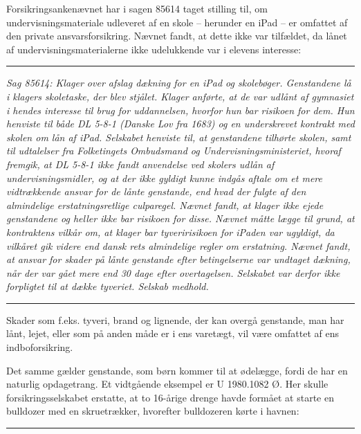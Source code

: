 \documentclass[]{book}
\begin{document}
Forsikringsankenævnet har i sagen 85614 taget stilling til, om undervisningsmateriale udleveret af en skole -- herunder en iPad -- er omfattet af den private ansvarsforsikring. Nævnet fandt, at dette ikke var tilfældet, da lånet af undervisningsmaterialerne ikke udelukkende var i elevens interesse:

\begin{center}\rule{0.5\linewidth}{\linethickness}\end{center}

\emph{Sag 85614: Klager over afslag dækning for en iPad og skolebøger. Genstandene lå i klagers skoletaske, der blev stjålet. Klager anførte, at de var udlånt af gymnasiet i hendes interesse til brug for uddannelsen, hvorfor hun bar risikoen for dem. Hun henviste til både DL 5-8-1 (Danske Lov fra 1683) og en underskrevet kontrakt med skolen om lån af iPad. Selskabet henviste til, at genstandene tilhørte skolen, samt til udtalelser fra Folketingets Ombudsmand og Undervisningsministeriet, hvoraf fremgik, at DL 5-8-1 ikke fandt anvendelse ved skolers udlån af undervisningsmidler, og at der ikke gyldigt kunne indgås aftale om et mere vidtrækkende ansvar for de lånte genstande, end hvad der fulgte af den almindelige erstatningsretlige culparegel. Nævnet fandt, at klager ikke ejede genstandene og heller ikke bar risikoen for disse. Nævnet måtte lægge til grund, at kontraktens vilkår om, at klager bar tyveririsikoen for iPaden var ugyldigt, da vilkåret gik videre end dansk rets almindelige regler om erstatning. Nævnet fandt, at ansvar for skader på lånte genstande efter betingelserne var undtaget dækning, når der var gået mere end 30 dage efter overtagelsen. Selskabet var derfor ikke forpligtet til at dække tyveriet. Selskab medhold.}

\begin{center}\rule{0.5\linewidth}{\linethickness}\end{center}

Skader som f.eks. tyveri, brand og lignende, der kan overgå genstande, man har lånt, lejet, eller som på anden måde er i ens varetægt, vil være omfattet af ens indboforsikring.

Det samme gælder genstande, som børn kommer til at ødelægge, fordi de har en naturlig opdagetrang. Et vidtgående eksempel er U 1980.1082 Ø. Her skulle forsikringsselskabet erstatte, at to 16-årige drenge havde formået at starte en bulldozer med en skruetrækker, hvorefter bulldozeren kørte i havnen:

\begin{center}\rule{0.5\linewidth}{\linethickness}\end{center}
\end{document}
